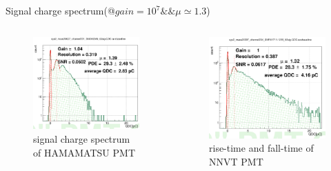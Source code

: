 \documentclass[11pt,compress,xcolor=x11names,UTF8]{beamer}
\begin{document}
\begin{frame}{Signal charge spectrum(@$gain=10^7\&\&\mu\simeq 1.3$)}
\begin{columns}
\begin{column}{.5\textwidth}
\begin{figure}
\centering
\includegraphics[width=\textwidth]{figures/hamcharge.png} %
\caption{signal charge spectrum of HAMAMATSU PMT}
\end{figure}
\end{column}
\begin{column}{.5\textwidth}
\begin{figure}
\centering
\includegraphics[width=\textwidth]{figures/mcpcharge.png} %
\caption{rise-time and fall-time of NNVT PMT}
\end{figure}
\end{column}
\end{columns}
\end{frame}
\end{document}
